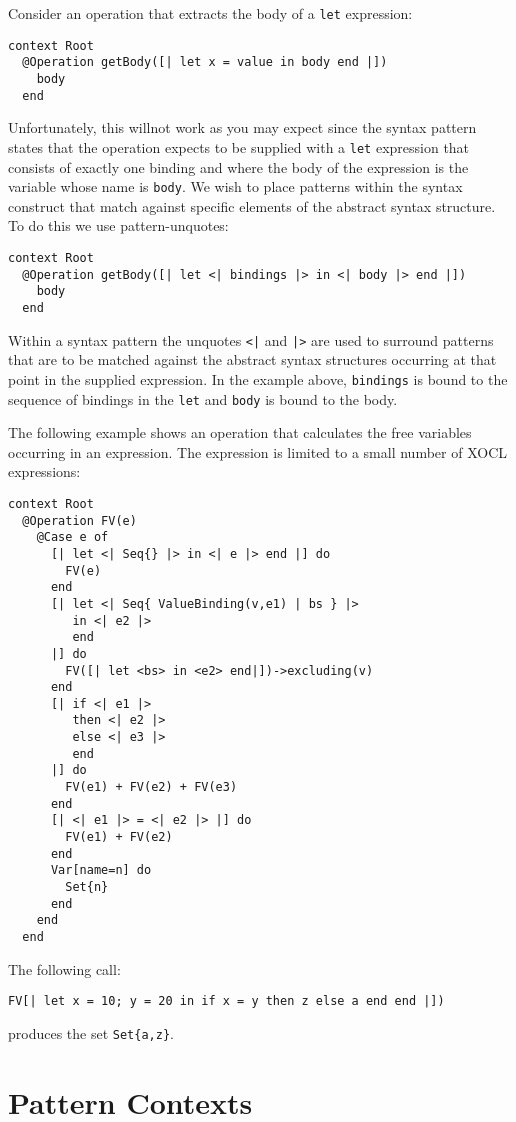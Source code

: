 \documentclass{article}
\begin{document}
\begin{description}
Consider an operation that extracts the body of a {\tt let} expression:
\begin{verbatim}
context Root
  @Operation getBody([| let x = value in body end |]) 
    body 
  end
\end{verbatim}
Unfortunately, this willnot work as you may expect since the syntax pattern
states that the operation expects to be supplied with a {\tt let} expression
that consists of exactly one binding and where the body of the expression
is the variable whose name is {\tt body}. We wish to place patterns within the
syntax construct that match against specific elements of the abstract
syntax structure. To do this we use pattern-unquotes:
\begin{verbatim}
context Root
  @Operation getBody([| let <| bindings |> in <| body |> end |]) 
    body 
  end
\end{verbatim}
Within a syntax pattern the unquotes {\tt <|} and {\tt |>} are used to
surround patterns that are to be matched against the abstract syntax
structures occurring at that point in the supplied expression. In the example
above, {\tt bindings} is bound to the sequence of bindings in the {\tt let}
and {\tt body} is bound to the body.

The following example shows an operation that calculates the free variables
occurring in an expression. The expression is limited to a small number
of XOCL expressions:
\begin{verbatim}
context Root
  @Operation FV(e)
    @Case e of
      [| let <| Seq{} |> in <| e |> end |] do 
        FV(e) 
      end
      [| let <| Seq{ ValueBinding(v,e1) | bs } |> 
         in <| e2 |> 
         end 
      |] do
        FV([| let <bs> in <e2> end|])->excluding(v)
      end
      [| if <| e1 |> 
         then <| e2 |> 
         else <| e3 |> 
         end 
      |] do
        FV(e1) + FV(e2) + FV(e3)
      end
      [| <| e1 |> = <| e2 |> |] do
        FV(e1) + FV(e2)
      end
      Var[name=n] do 
        Set{n} 
      end
    end
  end
\end{verbatim}
The following call:
\begin{verbatim}
FV[| let x = 10; y = 20 in if x = y then z else a end end |])
\end{verbatim}
produces the set {\tt Set\{a,z\}}.

\end{description}

\section{Pattern Contexts}
\end{document}
